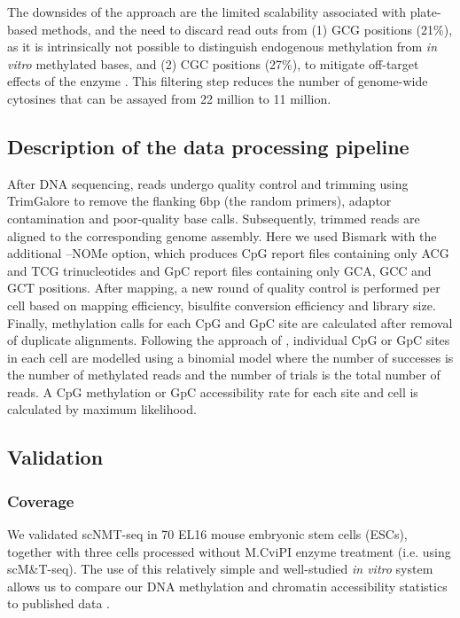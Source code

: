 The downsides of the approach are the limited scalability associated with plate-based methods, and the need to discard read outs from (1) GCG positions (21\%), as it is intrinsically not possible to distinguish endogenous methylation from \textit{in vitro} methylated bases, and (2) CGC positions (27\%), to mitigate off-target effects of the enzyme \cite{Kelly2012}. This filtering step reduces the number of genome-wide cytosines that can be assayed from 22 million to 11 million. 


\subsection{Description of the data processing pipeline}
After DNA sequencing, reads undergo quality control and trimming using TrimGalore\cite{XX} to remove the flanking 6bp (the random primers), adaptor contamination and poor-quality base calls. Subsequently, trimmed reads are aligned to the corresponding genome assembly. Here we used Bismark \cite{Krueger2011} with the additional --NOMe option, which produces CpG report files containing only ACG and TCG trinucleotides and GpC report files containing only GCA, GCC and GCT positions. After mapping, a new round of quality control is performed per cell based on mapping efficiency, bisulfite conversion efficiency and library size.\\
Finally, methylation calls for each CpG and GpC site are calculated after removal of duplicate alignments. Following the approach of \cite{Smallwood2014}, individual CpG or GpC sites in each cell are modelled using a binomial model where the number of successes is the number of methylated reads and the number of trials is the total number of reads. A CpG methylation or GpC accessibility rate for each site and cell is calculated by maximum likelihood.


\subsection{Validation}

\subsubsection{Coverage} \label{section:scnmt_coverage}
We validated scNMT-seq in 70 EL16 mouse embryonic stem cells (ESCs), together with three cells processed without M.CviPI enzyme treatment (i.e. using scM\&T-seq). The use of this relatively simple and well-studied \textit{in vitro} system allows us to compare our DNA methylation and chromatin accessibility statistics to published data \cite{Smallwood2014,Angermueller2016,Ficz2013}.

